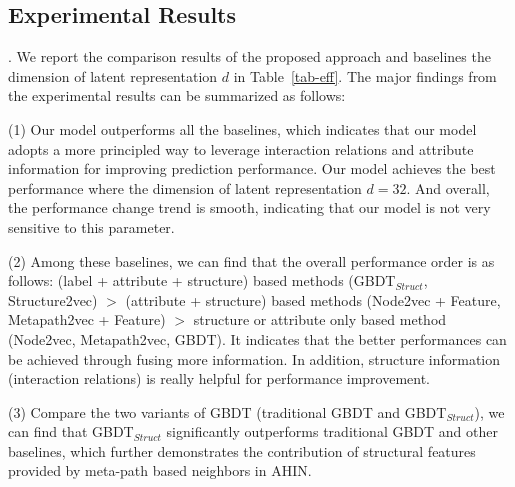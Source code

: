 \subsection{Experimental Results}
. We report the comparison results of the proposed approach and baselines \wrt the dimension of latent representation $d$ in Table~\ref{tab-eff}. The major findings from the experimental results can be summarized as follows:

(1) Our model outperforms all the baselines, which indicates that our model adopts a more principled way to leverage interaction relations and attribute information for improving prediction performance. Our model achieves the best performance where the dimension of latent representation $d = 32$. And overall, the performance change trend is smooth, indicating that our model is not very sensitive to this parameter.

(2) Among these baselines, we can find that the overall performance order is as follows: (label + attribute + structure) based methods (\ie GBDT$_{Struct}$, Structure2vec) $>$ (attribute + structure) based methods (\ie Node2vec + Feature, Metapath2vec + Feature) $>$ structure or attribute only based method (\ie Node2vec, Metapath2vec, GBDT). 
It indicates that the better performances can be achieved through fusing more information. In addition, structure information (\ie interaction relations) is really helpful for performance improvement.

(3) Compare the two variants of GBDT (\ie traditional GBDT and GBDT$_{Struct}$), we can find that GBDT$_{Struct}$ significantly outperforms traditional GBDT and other baselines, which further demonstrates the contribution of structural features provided by meta-path based neighbors in AHIN.






